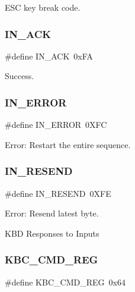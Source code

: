 E\+SC key break code. 

\hypertarget{group__i8042_ga91ac2ffa1978edadfaf6af64fb3e4faf}{}\label{group__i8042_ga91ac2ffa1978edadfaf6af64fb3e4faf} 
\subsubsection{\texorpdfstring{I\+N\+\_\+\+A\+CK}{IN\_ACK}}
{\footnotesize\ttfamily \#define I\+N\+\_\+\+A\+CK~0x\+FA}



Success. 

\hypertarget{group__i8042_ga975d13d25888550dcf4f69e5a6105cca}{}\label{group__i8042_ga975d13d25888550dcf4f69e5a6105cca} 
\subsubsection{\texorpdfstring{I\+N\+\_\+\+E\+R\+R\+OR}{IN\_ERROR}}
{\footnotesize\ttfamily \#define I\+N\+\_\+\+E\+R\+R\+OR~0\+X\+FC}



Error\+: Restart the entire sequence. 

\hypertarget{group__i8042_ga1cf5a4e33303a3893cc39b330319b1a0}{}\label{group__i8042_ga1cf5a4e33303a3893cc39b330319b1a0} 
\subsubsection{\texorpdfstring{I\+N\+\_\+\+R\+E\+S\+E\+ND}{IN\_RESEND}}
{\footnotesize\ttfamily \#define I\+N\+\_\+\+R\+E\+S\+E\+ND~0\+X\+FE}



Error\+: Resend latest byte. 

K\+BD Responses to Inputs \hypertarget{group__i8042_ga6d57c7927a10f638c83046b52c8caac9}{}\label{group__i8042_ga6d57c7927a10f638c83046b52c8caac9} 
\subsubsection{\texorpdfstring{K\+B\+C\+\_\+\+C\+M\+D\+\_\+\+R\+EG}{KBC\_CMD\_REG}}
{\footnotesize\ttfamily \#define K\+B\+C\+\_\+\+C\+M\+D\+\_\+\+R\+EG~0x64}



